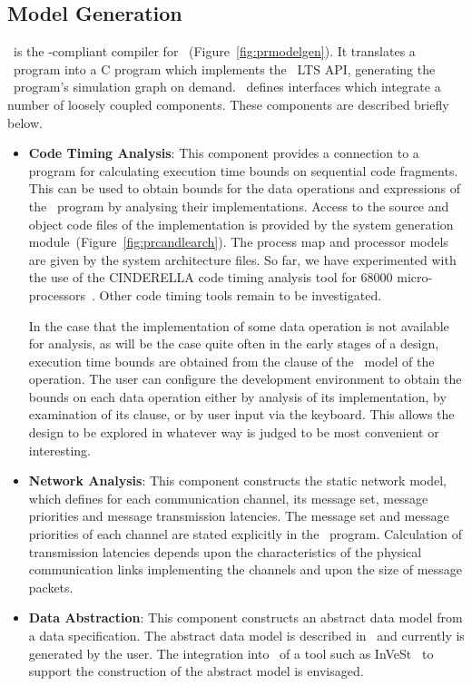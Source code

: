 \subsection{Model Generation}
\candleopen\ is the \opencaesar-compliant compiler for 
\candle~(Figure~\ref{fig:prmodelgen}). It translates a \candle\
program into a C program which implements the \opencaesar\ LTS API,
generating the \candle\ program's simulation graph on demand. \candleopen\
defines interfaces which integrate a number of loosely coupled 
components. These components are described briefly below. 
\begin{itemize}
\item \textbf{Code Timing Analysis}: 
This component provides a connection to a program for calculating
execution time bounds on sequential code fragments.  This can be used
to obtain bounds for the data operations and expressions of the
\candle\ program by analysing their implementations. Access to the
source and object code files of the implementation is provided by the
system generation module~(Figure~\ref{fig:prcandlearch}). The process
map and processor models are given by the system architecture files. So
far, we have experimented with the use of the CINDERELLA code timing
analysis tool for 68000 micro-processors~\cite{lmw:95}. Other code
timing tools remain to be investigated.  

In the case that the implementation of some data operation is not
available for analysis, as will be the case quite often in the early
stages of a design, execution time bounds are obtained from the
\trm{bounds} clause of the \sdml\ model of the operation.  
The user can configure the development environment to obtain the
bounds on each data operation either by analysis of its
implementation, by examination of its \trm{bounds} clause, or by user
input via the keyboard. This allows the design to be explored in
whatever way is judged to be most convenient or interesting.

\item \textbf{Network Analysis}:
This component constructs the static network model, which defines
for each communication channel, its message set, message priorities and
message transmission latencies. The message set and message priorities
of each channel are stated explicitly in the \candle\ program. Calculation
of transmission latencies depends upon the characteristics of the
physical communication links implementing the channels and upon
the size of message packets. 

\item \textbf{Data Abstraction}:
This component constructs an abstract data model from a data specification.
The abstract data model is described in \sdml\ and currently is generated by 
the user. The integration into \candleopen\ of a tool such as 
InVeSt~\cite{blo:98} to support the construction of the abstract model is
envisaged.  


\end{itemize}
